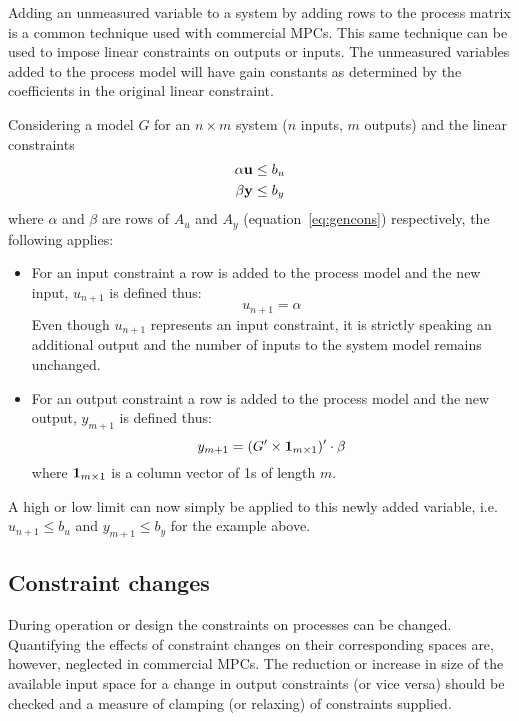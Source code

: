 \documentclass[final,authoryear,5pt,times,twocolumn]{elsarticle}
\newcommand{\vect}[1] %
{{\bf {#1}}}
\begin{document}
Adding an unmeasured variable to a system by adding rows to the process matrix is a common technique used with commercial MPCs.
This same technique can be used to impose linear constraints on outputs or inputs.
The unmeasured variables added to the process model will have gain constants as determined by the coefficients in the original linear constraint.

Considering a model $G$ for an $n\times m$ system ($n$ inputs, $m$ outputs) and the linear constraints 
\begin{align}
  \alpha \vect{u} &\leq b_u\notag\\ 
  \beta \vect{y} &\leq b_y \notag   
\end{align}
where $\alpha$ and $\beta$ are rows of $A_u$ and $A_y$ (equation~\ref{eq:gencons}) respectively, the following applies:
\begin{itemize}
\item For an input constraint a row is added to the process model and the new input, $u_{n+1}$ is defined thus:
\begin{equation}
  \label{eq:linconinput}
   u_{n+1} = \alpha
\end{equation}
Even though $u_{n+1}$ represents an input constraint, it is strictly speaking an additional output and the number of inputs to the system model remains unchanged. 
\item For an output constraint a row is added to the process model and the new output, $y_{m+1}$ is defined thus:
\begin{equation}
  \label{eq:linconoutput}
   y_{m+1} = (G'\times\vect{1}_{m\times 1})'\cdot\beta
\end{equation}
where $\vect{1}_{m\times 1}$ is a column vector of 1s of length $m$.
\end{itemize}
A high or low limit can now simply be applied to this newly added variable, i.e. $u_{n+1}\leq b_u$ and $y_{m+1}\leq b_y$ for the example above.

\subsection{Constraint changes}
During operation or design the constraints on processes can be changed.
Quantifying the effects of constraint changes on their corresponding spaces are, however, neglected in commercial MPCs.
The reduction or increase in size of the available input space for a change in output constraints (or vice versa) should be checked and a measure of clamping (or relaxing) of constraints supplied.
\end{document}
